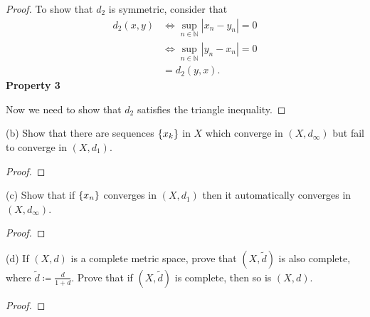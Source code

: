 \documentclass{article}
\newcommand{\N}{\mathbb{N}}
\begin{document}
\begin{proof}
To show that $d_2$ is symmetric, consider that
%
\begin{align*}
    d_2(x, y)
        &\iff \sup_{n \in \N} |x_n - y_n| = 0 \\
        &\iff \sup_{n \in \N} |y_n - x_n| = 0 \\
        &= d_2(y, x)
        .
\end{align*}
%
\textbf{Property 3}

Now we need to show that $d_2$ satisfies the triangle inequality.

\end{proof}

(b) Show that there are sequences $\cbr{x_k}$ in $X$ which converge in
$(X, d_{\infty})$ but fail to converge in $(X, d_1)$.

\begin{proof}
\end{proof}

(c) Show that if $\cbr{x_n}$ converges in $(X, d_1)$ then it
automatically converges in $(X, d_{\infty})$.

\begin{proof}
\end{proof}

(d) If $(X, d)$ is a complete metric space, prove that $(X, \tilde{d})$
is also complete, where $\tilde{d} \coloneqq \frac{d}{1 + d}$. Prove
that if $(X, \tilde{d})$ is complete, then so is $(X, d)$.

\begin{proof}
\end{proof}
\end{document}

